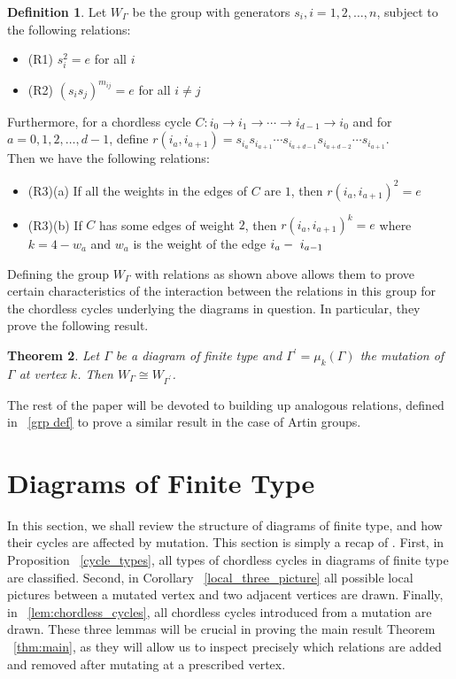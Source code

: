 \documentclass[11pt]{amsart}
\newtheorem{thm}{Theorem}[section]
\theoremstyle{definition}
\newtheorem{defn}[thm]{Definition}
\begin{document}
\begin{defn}
Let $W_{\Gamma}$ be the group with generators $s_i, i = 1,2,\ldots, n$, subject to the following relations:
\begin{itemize}
\item{(R1)} $s_i^2 = e$ for all $i$
\item{(R2)} $\left(s_is_j\right)^{m_{ij}} = e$ for all $i \neq j$
\end{itemize}
Furthermore, for a chordless cycle $C : i_0 \rightarrow i_1 \rightarrow \cdots \rightarrow i_{d-1} \rightarrow i_0$ and for $a = 0,1,2,\ldots, d-1$, define \textbf{$r\left(i_a, i_{a+1}\right) = s_{i_a}s_{i_{a+1}} \cdots s_{i_{a+d-1}}s_{i_{a+d-2}} \cdots s_{i_{a+1}}$}.\\

\vspace{0.1cm}
Then we have the following relations:
\begin{itemize}
\item{(R3)(a)} If all the weights in the edges of $C$ are $1$, then $r(i_a, i_{a+1})^2 = e$
\item{(R3)(b)} If $C$ has some edges of weight $2$, then $r(i_a, i_{a+1})^k = e$ where $k = 4-w_a$ and $w_a$ is the weight of the edge $i_a\--\ i_{a-1}$
\end{itemize}
\end{defn}

Defining the group $W_{\Gamma}$ with relations as shown above allows them to prove certain characteristics of the interaction between the relations in this group for the chordless cycles underlying the diagrams in question. In particular, they prove the following result.
\begin{thm}\cite[Theorem 5.4a]{BM13}
Let $\Gamma$ be a diagram of finite type and $\Gamma^{\prime} = \mu_k(\Gamma)$ the mutation of $\Gamma$ at vertex $k$. Then $W_{\Gamma} \cong W_{\Gamma^{\prime}}$.
\end{thm}

The rest of the paper will be devoted to building up analogous relations, defined in ~\ref{grp def} to prove a similar result in the case of Artin groups.


\section{Diagrams of Finite Type}
\label{sec:finite-type_diagrams}

In this section, we shall review the structure of diagrams of finite type, and how their cycles are affected by mutation. This section is simply a recap of \cite[Section 2]{BM13}. First, in Proposition ~\ref{cycle_types}, all types of chordless cycles in diagrams of finite type are classified. Second, in Corollary ~\ref{local_three_picture} all possible local pictures between a mutated vertex and two adjacent vertices are drawn. Finally, in ~\ref{lem:chordless_cycles}, all chordless cycles introduced from a mutation are drawn. These three lemmas will be crucial in proving the main result Theorem ~\ref{thm:main}, as they will allow us to inspect precisely which relations are added and removed after mutating at a prescribed vertex.
\end{document}
